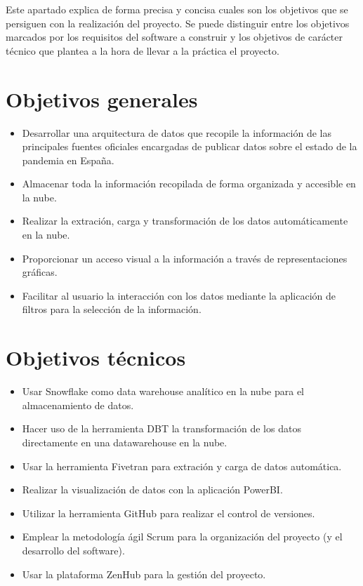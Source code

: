 
Este apartado explica de forma precisa y concisa cuales son los objetivos que se persiguen con la realización del proyecto. Se puede distinguir entre los objetivos marcados por los requisitos del software a construir y los objetivos de carácter técnico que plantea a la hora de llevar a la práctica el proyecto.


\section{Objetivos generales}\label{objetivos-generales}
\begin{itemize}
    \item Desarrollar una arquitectura de datos que recopile la información de las principales fuentes oficiales encargadas de publicar datos sobre el estado de la pandemia en España.
    \item Almacenar toda la información recopilada de forma organizada y accesible en la nube.
    \item Realizar la extración, carga y transformación de los datos automáticamente en la nube.
    \item Proporcionar un acceso visual a la información a través de representaciones gráficas.
    \item Facilitar al usuario la interacción con los datos mediante la aplicación de filtros para la selección de la información.
\end{itemize}

\section{Objetivos técnicos}\label{objetivos-tecnicos}
\begin{itemize}
    \item Usar Snowflake como data warehouse analítico en la nube para el almacenamiento de datos.
    \item Hacer uso de la herramienta DBT la transformación de los datos directamente en una datawarehouse en la nube.
    \item Usar la herramienta Fivetran para extración y carga de datos automática.
    \item Realizar la visualización de datos con la aplicación PowerBI.
    \item Utilizar la herramienta GitHub para realizar el control de versiones.
    \item Emplear la metodología ágil Scrum para la organización del proyecto (y el desarrollo del software).
    \item Usar la plataforma ZenHub para la gestión del proyecto.
\end{itemize}

